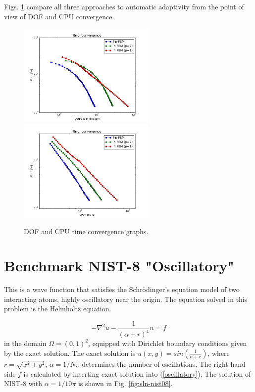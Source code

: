\documentclass[12pt]{elsarticle}
\begin{document}
Figs. \ref{fig:nist-7-conv} compare all
three approaches to automatic adaptivity from the point
of view of DOF and CPU convergence.

\begin{figure}[!ht]
\centering
\includegraphics[height=5cm]{nist/nist-7/conv_dof_aniso.png}\ \
\includegraphics[height=5cm]{nist/nist-7/conv_cpu_aniso.png}
\caption{DOF and CPU time convergence graphs.}
\label{fig:nist-7-conv}
\end{figure}



\section{Benchmark NIST-8 "Oscillatory"}
\label{sec:bench-8}

This is a wave function that satisfies the Schr\"{o}dinger's equation model of two
interacting atoms, highly oscillatory near the origin.
The equation solved in this problem is the Helmholtz equation.

\begin{equation} \label{oscillatory}
-\nabla^{2} u - \frac{1}{(\alpha + r)^{4}} u = f
\end{equation}
in the domain $\Omega = (0, 1)^2$, equipped with Dirichlet boundary conditions
given by the exact solution. The exact solution is
$u(x,y) = sin(\frac{1}{\alpha + r})$,
where $r = \sqrt{x^{2} + y^{2}}$, $\alpha = 1 / N \pi$ determines the number of oscillations.
The right-hand side $f$ is calculated by inserting exact solution into (\ref{oscillatory}).
The solution of NIST-8 with $\alpha = 1 / 10 \pi$ is shown in Fig. \ref{fig:sln-nist08}.
\end{document}
